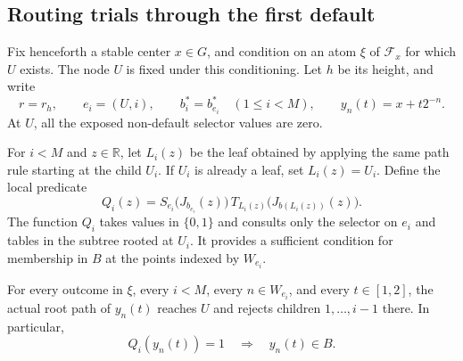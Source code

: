 \subsection{Routing trials through the first default}

Fix henceforth a stable center \(x\in G\), and condition on an atom
\(\xi\) of \(\mathcal F_x\) for which \(U\) exists.
The node \(U\) is fixed under this conditioning.  Let \(h\) be its
height, and write
\[
 r=r_h,\qquad e_i=(U,i),\qquad b_i^*=b_{e_i}^*
 \quad(1\le i<M),\qquad y_n(t)=x+t2^{-n}.
\]
At \(U\), all the exposed non-default selector values are zero.

For \(i<M\) and \(z\in\mathbb R\), let \(L_i(z)\) be the leaf obtained
by applying the same path rule starting at the child \(U_i\).
If \(U_i\) is already a leaf, set \(L_i(z)=U_i\).
Define the local predicate
\begin{equation}
 \label{eq:local-predicate}
 Q_i(z)=
 S_{e_i}\bigl(J_{b_{e_i}}(z)\bigr)\,
 T_{L_i(z)}\bigl(J_{b(L_i(z))}(z)\bigr).
\end{equation}
The function \(Q_i\) takes values in \(\{0,1\}\) and consults only
the selector on \(e_i\) and tables in the subtree rooted at \(U_i\).
It provides a sufficient condition for membership in \(B\) at the
points indexed by \(W_{e_i}\).

\begin{lemma}
 \label{lem:routing}
For every outcome in \(\xi\), every \(i<M\), every \(n\in W_{e_i}\),
and every \(t\in[1,2]\), the actual root path of \(y_n(t)\) reaches
\(U\) and rejects children \(1,\ldots,i-1\) there.
In particular,
\begin{equation}
 \label{eq:local-hit}
 Q_i(y_n(t))=1
 \quad\Longrightarrow\quad y_n(t)\in B.
\end{equation}
\end{lemma}

